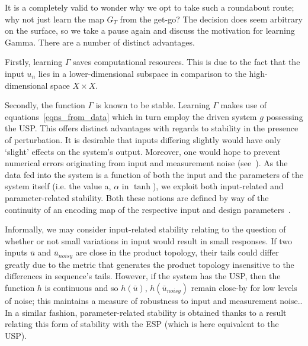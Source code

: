 It is a completely valid to wonder why we opt to take such a roundabout route; why not just learn the map $G_T$ from the get-go? The decision does seem arbitrary on the surface, so we take a pause again and discuss the motivation for learning Gamma.
There are a number of distinct advantages. 

Firstly, learning $\Gamma$ saves computational resources. This is due to the fact that the input $u_n$ lies in a lower-dimensional subspace in comparison to the high-dimensional space $X\times{X}$. 


Secondly, the function $\Gamma$ is known to be stable. Learning $\Gamma$ makes use of equations~\ref{eqns_from_data} which in turn employ the driven system $g$ possessing the USP. This offers distinct advantages with regards to stability in the presence of perturbation. 
It is desirable that inputs differing slightly would have only ‘slight’ effects on the system's output. 
Moreover, one would hope to prevent numerical errors originating from input and measurement noise (see~\cite[Theorem. 5]{manjunath2021universal}). 
As the data fed into the system is a function of both the input and the parameters of the system itself (i.e. the value a, $\alpha$ in $\tanh$), we exploit both input-related and parameter-related stability. 
Both these notions are defined by way of the continuity of an encoding map of the respective input and design parameters~\cite{manjunath2020stability}.

Informally, we may consider input-related stability relating to the question of whether or not small variations in input would result in small responses.   
If two inputs $\bar{u}$ and $\bar{u}_{noisy}$ are close in the product topology, their tails could differ greatly due to the metric that generates the product topology insensitive to the differences in sequence's tails.
 However, if the system has the USP, then the function $h$ is continuous and so $h(\bar{u})$, $h(\bar{u}_{noisy})$ remain close-by for low levels of noise; this maintains a measure of robustness to input and measurement noise.\cite{manjunath2021universal}.
In a similar fashion, parameter-related stability is obtained thanks to a result~\cite[Lemma 3.2]{manjunath2020stability} relating this form of stability with the ESP (which is here equivalent to the USP).

